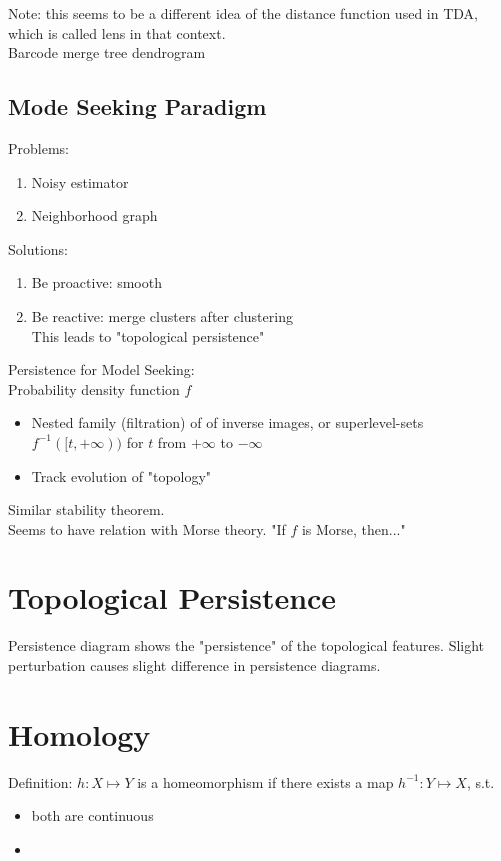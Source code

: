 \documentclass[10pt,a4paper]{article}
\begin{document}
Note: this seems to be a different idea of the distance function used in TDA, which is called lens in that context.\\

Barcode \textrightarrow merge tree \textrightarrow dendrogram

\subsection{Mode Seeking Paradigm}
Problems:
\begin{enumerate}
	\item Noisy estimator
	\item Neighborhood graph
\end{enumerate}
Solutions:
\begin{enumerate}
	\item Be proactive: smooth
	\item Be reactive: merge clusters after clustering\\
		  This leads to "topological persistence"
\end{enumerate}

Persistence for Model Seeking:\\
Probability density function $f$\\
\begin{itemize}
	\item Nested family (filtration) of of inverse images, or superlevel-sets $f^{-1}([t,+\infty))$ for 			  $t$ from $+\infty$ to $-\infty$
	\item Track evolution of "topology"
\end{itemize}
Similar stability theorem.\\
Seems to have relation with Morse theory. "If $f$ is Morse, then..."\\

\section{Topological Persistence}
Persistence diagram shows the "persistence" of the topological features.
Slight perturbation causes slight difference in persistence diagrams.

\section{Homology}
Definition: $h:X\mapsto Y$ is a homeomorphism if there exists a map $h^{-1}:Y\mapsto X$, s.t.
\begin{itemize}
	\item both are continuous
	\item
\end{itemize}
\end{document}
